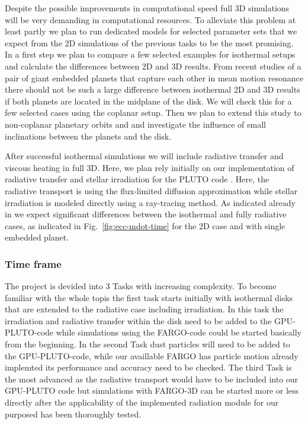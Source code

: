 \documentclass[10pt,fleqn,twoside]{article}
\begin{document}
\begin{description}
Despite the possible improvements in computational speed full 3D simulations will be very
demanding in computational resources. To alleviate this problem at least partly we plan to run
dedicated models for selected parameter sets that we expect from the 2D simulations of the previous
tasks to be the most promising. In a first step we plan to compare a few selected examples for
isothermal setups and calculate the differences between 2D and 3D results.
From recent studies of a pair of giant embedded planets that capture each other
in mean motion resonance there should not be such a large difference between isothermal 2D and 3D results
\citep{2016MNRAS.461.4406A} if both planets are located in the midplane of the disk. 
We will check this for a few selected cases using the coplanar setup.
Then we plan to extend this study to non-coplanar planetary orbits and
and investigate the influence of small inclinations between the planets and the disk.

After successful isothermal simulations we will include radiative transfer and viscous heating in full 3D.
Here, we plan rely initially on our implementation of radiative transfer and stellar irradiation for the
PLUTO code \citep{2013A&A...559A..80K}. Here, the radiative transport is using the flux-limited diffusion
approximation while stellar irradiation is modeled directly using a ray-tracing method.
As indicated already in \citet{2013A&A...560A..40M} we expect significant differences between the 
isothermal and fully radiative cases, as indicated in Fig.~\ref{fig:ecc-mdot-time} for the 2D case and
with single embedded planet.


\end{description}

\subsubsection{Time frame}
The project is devided into 3 Tasks with increasing complexity. To become
familiar with the whole topis the first task starts initially with isothermal disks that are extended 
to the radiative case including irradiation. In this task the irradiation and radiative transfer within the disk
need to be added to the GPU-PLUTO-code while simulations using the FARGO-code could be started basically 
from the beginning. In the second Task dust particles will need to be added to the GPU-PLUTO-code,
while our availlable FARGO has particle motion already implemted its performance and accuracy need to be
checked. The third Task is the most advanced as the radiative transport would have to be included into
our GPU-PLUTO code but simulations with FARGO-3D can be started more or less directly after the 
applicability of the implemented radiation module for our purposed has been thoroughly tested.
\end{document}
